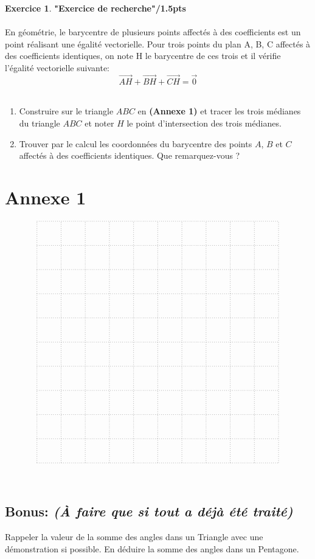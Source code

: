 \documentclass[a4paper,10.9pt]{article}
\theoremstyle{definition}
\newtheorem{exo}{Exercice}
\newcommand{\V}{\overrightarrow}
\begin{document}
\begin{exo}\textbf{"Exercice de recherche"}\hfill\textbf{/1.5pts}\\\hfil\\
	En géométrie, le barycentre de plusieurs points affectés à des coefficients est un point réalisant une égalité vectorielle. Pour trois points du plan A, B, C affectés à des coefficients identiques, on note H le barycentre de ces trois et il vérifie l'égalité vectorielle suivante:
	$$\V{AH} + \V{BH} + \V{CH} = \V{0}$$\hfil\\[0.5cm]
\begin{enumerate}
	\item Construire sur le triangle $ABC$ en \textbf{(Annexe 1)} et tracer les trois médianes du triangle $ABC$ et noter $H$ le point d'intersection des trois médianes.\\[0.5cm]
	\item Trouver par le calcul les coordonnées du barycentre des points $A$, $B$ et $C$ affectés à des coefficients identiques. Que remarquez-vous ? \\[1cm]
\end{enumerate}	  
\end{exo}

\section*{Annexe 1}
$$\begin{tikzpicture}[scale=1]
	\draw[dotted] (-5,-5) grid (5,5);	
\end{tikzpicture}$$

\hfil\\[6cm]
\subsection*{Bonus: \textit{\small(À faire que si tout a déjà été traité)}}
Rappeler la valeur de la somme des angles dans un Triangle avec une démonstration si possible. En déduire la somme des angles dans un Pentagone. 
\end{document}
